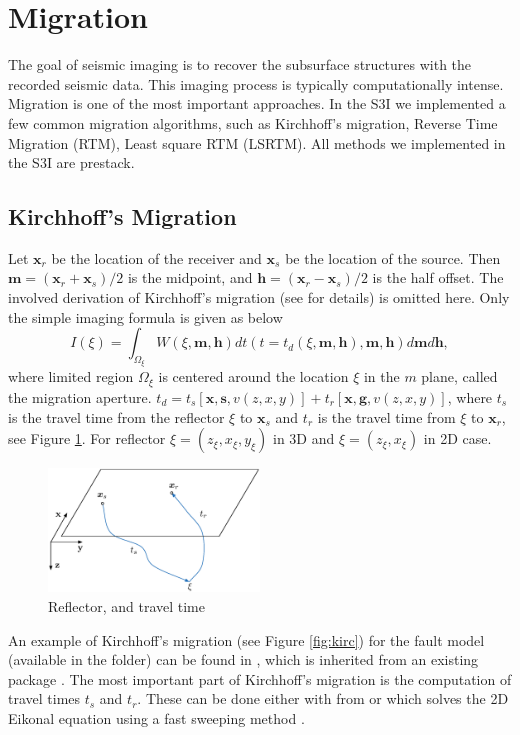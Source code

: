 \documentclass[11pt,titlepage]{article}
\newcommand{\bx}{\boldsymbol{x}}
\newcommand{\bg}{\boldsymbol{g}}
\newcommand{\bh}{\boldsymbol{h}}
\newcommand{\bs}{\boldsymbol{s}}
\newcommand{\bm}{\boldsymbol{m}}
\theoremstyle{plain}
\theoremstyle{definition}
\theoremstyle{remark}
\numberwithin{equation}{section}
\begin{document}
\section{Migration}
The goal of seismic imaging is to recover the subsurface structures with the recorded seismic data. This imaging process is 
typically computationally intense. Migration is one of the most important approaches. In the S3I we implemented a few common 
migration algorithms, such as
Kirchhoff's migration, Reverse Time Migration (RTM), Least square RTM (LSRTM).
All methods we implemented in the S3I are prestack.  


\subsection{Kirchhoff's Migration}
Let $\bx_r$ be the location of the receiver and $\bx_s$ be the location of the source. 
Then $\bm=(\bx_r+\bx_s)/2$ is the midpoint, and $\bh=(\bx_r-\bx_s)/2$ is the half offset.
The involved derivation of Kirchhoff's migration (see \cite{Schneider:1978aa} for details) is omitted here. Only the simple imaging formula 
is given as below
\begin{equation}
\label{eq:kirchhoffImaging}
I(\xi)=\int_{\Omega_\xi} W(\xi,\bm,\bh)dt(t=t_d(\xi,
\bm,\bh),\bm,\bh)d\bm d\bh,
\end{equation}
where limited region $\Omega_\xi$ is centered around the location $\xi$
in the $m$ plane, called the migration aperture. $t_d=t_s[\bx,\bs,v(z,x,y)]+t_r[\bx,\bg,v(z,x,y)]$, where $t_s$ is the travel time from the reflector $\xi$ to $\bx_s$ and $t_r$ is the travel time from $\xi$ to $\bx_r$, see Figure \ref{fig:ref}.
For reflector $\xi = (z_\xi, x_\xi, y_\xi)$ in 3D and $\xi = (z_\xi, x_\xi)$ in 2D case.

\begin{figure}[htbp]
\centering
\includegraphics[width=0.5\textwidth]{Fig/tstr}
\caption{Reflector, and travel time}
\label{fig:ref}
\end{figure}
  
An example of Kirchhoff's migration (see Figure \ref{fig:kirc}) for the fault model (available in the  folder) can 
be found in , which is 
inherited from an existing package \cite{Kozola:2011aa}.
The most important part of Kirchhoff's migration is the computation of travel times $t_s$ and $t_r$.   
These can be done either with  from \cite{Kozola:2011aa} or
 which solves the 2D Eikonal equation using a fast sweeping method \cite{Zhao:2004aa}.
\end{document}
